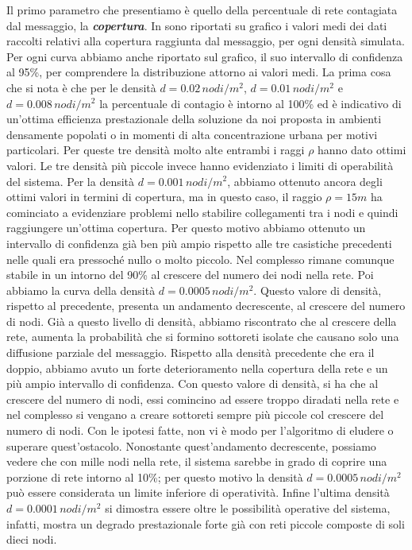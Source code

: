 Il primo parametro che presentiamo è quello della percentuale di rete contagiata dal messaggio, la \textbf{\textit{copertura}}. In  sono riportati su grafico i valori medi dei dati raccolti relativi alla copertura raggiunta dal messaggio, per ogni densità simulata. Per ogni curva abbiamo anche riportato sul grafico, il suo intervallo di confidenza al 95\%, per comprendere la distribuzione attorno ai valori medi. La prima cosa che si nota è che per le densità $d=0.02\, nodi/m^2$, $d=0.01\, nodi/m^2$ e $d=0.008\, nodi/m^2$ la percentuale di contagio è intorno al 100\% ed è indicativo di un'ottima efficienza prestazionale della soluzione da noi proposta in ambienti densamente popolati o in momenti di alta concentrazione urbana per motivi particolari. Per queste tre densità molto alte entrambi i raggi $\rho$ hanno dato ottimi valori. Le tre densità più piccole invece hanno evidenziato i limiti di operabilità del sistema. Per la densità $d=0.001\, nodi/m^2$, abbiamo ottenuto ancora degli ottimi valori in termini di copertura, ma in questo caso, il raggio $\rho=15m$ ha cominciato a evidenziare problemi nello stabilire collegamenti tra i nodi e quindi raggiungere un'ottima copertura. Per questo motivo abbiamo ottenuto un intervallo di confidenza già ben più ampio rispetto alle tre casistiche precedenti nelle quali era pressoché nullo o molto piccolo. Nel complesso rimane comunque stabile in un intorno del 90\% al crescere del numero dei nodi nella rete.
Poi abbiamo la curva della densità $d=0.0005\, nodi/m^2$. Questo valore di densità, rispetto al precedente, presenta un andamento decrescente, al crescere del numero di nodi. Già a questo livello di densità, abbiamo riscontrato che al crescere della rete, aumenta la probabilità che si formino sottoreti isolate che causano solo una diffusione parziale del messaggio. Rispetto alla densità precedente che era il doppio, abbiamo avuto un forte deterioramento nella copertura della rete e un più ampio intervallo di confidenza. Con questo valore di densità, si ha che al crescere del numero di nodi, essi comincino ad essere troppo diradati nella rete e nel complesso si vengano a creare sottoreti sempre più piccole col crescere del numero di nodi. Con le ipotesi fatte, non vi è modo per l'algoritmo di eludere o superare quest'ostacolo. Nonostante quest'andamento decrescente, possiamo vedere che con mille nodi nella rete, il sistema sarebbe in grado di coprire una porzione di rete intorno al 10\%; per questo motivo la densità $d=0.0005\, nodi/m^2$ può essere considerata un limite inferiore di operatività. Infine l'ultima densità $d=0.0001\, nodi/m^2$ si dimostra essere oltre le possibilità operative del sistema, infatti, mostra un degrado prestazionale forte già con reti piccole composte di soli dieci nodi.

